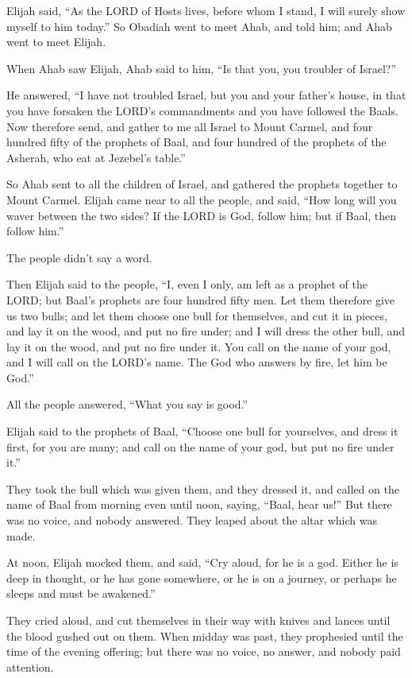 \myverse{}Elijah said, “As the LORD of Hosts lives, before whom I stand,
I will surely show myself to him today.”
\myverse{}So Obadiah went to meet Ahab, and told him; and Ahab went to meet Elijah.

\myverse{}When Ahab saw Elijah, Ahab said to him, “Is that you, you troubler
of Israel?”

\myverse{}He answered, “I have not troubled Israel, but you and your father’s
house, in that you have forsaken the LORD’s commandments and you have followed the Baals.
\myverse{}Now therefore send, and gather to me all Israel to Mount Carmel, and four
hundred fifty of the prophets of Baal, and four hundred of the prophets of the Asherah, who eat at Jezebel’s
table.”

\myverse{}So Ahab sent to all the children of Israel, and gathered the
prophets together to Mount Carmel.
\myverse{}Elijah came near to all the people, and said, “How long will you waver between
the two sides? If the LORD is God, follow him; but if Baal, then follow him.”

The people didn’t say a word.

\myverse{}Then Elijah said to the people, “I, even I only, am left as
a prophet of the LORD; but Baal’s prophets are four hundred fifty men.
\myverse{}Let them therefore give us two bulls; and let them choose one bull for themselves,
and cut it in pieces, and lay it on the wood, and put no fire under; and I will dress the other bull,
and lay it on the wood, and put no fire under it.
\myverse{}You call on the name of your god, and I will call on the LORD’s name. The
God who answers by fire, let him be God.”

All the people answered, “What you say is good.”

\myverse{}Elijah said to the prophets of Baal, “Choose one bull for yourselves,
and dress it first, for you are many; and call on the name of your god, but put no fire under it.”

\myverse{}They took the bull which was given them, and they dressed it,
and called on the name of Baal from morning even until noon, saying, “Baal, hear us!” But there was no
voice, and nobody answered. They leaped about the altar which was made.

\myverse{}At noon, Elijah mocked them, and said, “Cry aloud, for he is
a god. Either he is deep in thought, or he has gone somewhere, or he is on a journey, or perhaps he sleeps
and must be awakened.”

\myverse{}They cried aloud, and cut themselves in their way with knives
and lances until the blood gushed out on them.
\myverse{}When midday was past, they prophesied until the time of the evening offering;
but there was no voice, no answer, and nobody paid attention.

